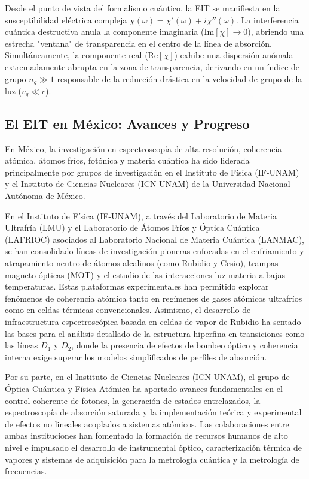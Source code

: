 Desde el punto de vista del formalismo cuántico, la EIT se manifiesta en la susceptibilidad eléctrica compleja $\chi(\omega) = \chi'(\omega) + i\chi''(\omega)$. La interferencia cuántica destructiva anula la componente imaginaria ($\text{Im}[\chi] \to 0$), abriendo una estrecha "ventana" de transparencia en el centro de la línea de absorción. Simultáneamente, la componente real ($\text{Re}[\chi]$) exhibe una dispersión anómala extremadamente abrupta en la zona de transparencia, derivando en un índice de grupo $n_g \gg 1$ responsable de la reducción drástica en la velocidad de grupo de la luz ($v_g \ll c$).
\subsection{El EIT en México: Avances y Progreso}
En México, la investigación en espectroscopía de alta resolución, coherencia atómica, átomos fríos, fotónica y materia cuántica ha sido liderada principalmente por grupos de investigación en el Instituto de Física (IF-UNAM) y el Instituto de Ciencias Nucleares (ICN-UNAM) de la Universidad Nacional Autónoma de México.

En el Instituto de Física (IF-UNAM), a través del Laboratorio de Materia Ultrafría (LMU) y el Laboratorio de Átomos Fríos y Óptica Cuántica (LAFRIOC) asociados al Laboratorio Nacional de Materia Cuántica (LANMAC), se han consolidado líneas de investigación pioneras enfocadas en el enfriamiento y atrapamiento neutro de átomos alcalinos (como Rubidio y Cesio), trampas magneto-ópticas (MOT) y el estudio de las interacciones luz-materia a bajas temperaturas. Estas plataformas experimentales han permitido explorar fenómenos de coherencia atómica tanto en regímenes de gases atómicos ultrafríos como en celdas térmicas convencionales. Asimismo, el desarrollo de infraestructura espectroscópica basada en celdas de vapor de Rubidio ha sentado las bases para el análisis detallado de la estructura hiperfina en transiciones como las líneas $D_1$ y $D_2$, donde la presencia de efectos de bombeo óptico y coherencia interna exige superar los modelos simplificados de perfiles de absorción. 

Por su parte, en el Instituto de Ciencias Nucleares (ICN-UNAM), el grupo de Óptica Cuántica y Física Atómica ha aportado avances fundamentales en el control coherente de fotones, la generación de estados entrelazados, la espectroscopía de absorción saturada y la implementación teórica y experimental de efectos no lineales acoplados a sistemas atómicos. Las colaboraciones entre ambas instituciones han fomentado la formación de recursos humanos de alto nivel e impulsado el desarrollo de instrumental óptico, caracterización térmica de vapores y sistemas de adquisición para la metrología cuántica y la metrología de frecuencias.

